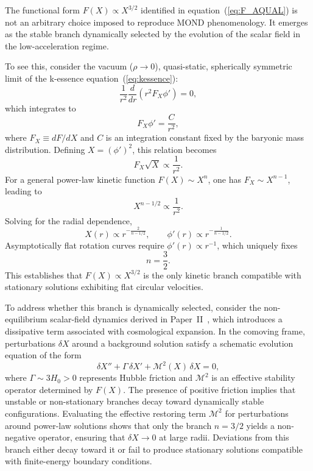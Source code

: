 \documentclass[11pt,a4paper]{article}
\begin{document}
The functional form $F(X) \propto X^{3/2}$ identified in
equation~(\ref{eq:F_AQUAL}) is not an arbitrary choice imposed to reproduce
MOND phenomenology. It emerges as the stable branch dynamically selected by the
evolution of the scalar field in the low-acceleration regime.

To see this, consider the vacuum ($\rho \to 0$), quasi-static, spherically
symmetric limit of the k-essence equation~(\ref{eq:kessence}):
\begin{equation}
  \frac{1}{r^2}\frac{d}{dr}\left(r^2 F_X \phi'\right) = 0,
\end{equation}
which integrates to
\begin{equation}
  F_X \phi' = \frac{C}{r^2},
\end{equation}
where $F_X \equiv dF/dX$ and $C$ is an integration constant fixed by the
baryonic mass distribution. Defining $X = (\phi')^2$, this relation becomes
\begin{equation}
  F_X \sqrt{X} \propto \frac{1}{r^2}.
\end{equation}
For a general power-law kinetic function $F(X)\sim X^n$, one has
$F_X \sim X^{n-1}$, leading to
\begin{equation}
  X^{n - 1/2} \propto \frac{1}{r^2}.
\end{equation}
Solving for the radial dependence,
\begin{equation}
  X(r) \propto r^{-\frac{2}{n - 1/2}},
  \qquad
  \phi'(r) \propto r^{-\frac{1}{n - 1/2}}.
\end{equation}
Asymptotically flat rotation curves require $\phi'(r) \propto r^{-1}$,
which uniquely fixes
\begin{equation}
  n = \frac{3}{2}.
\end{equation}
This establishes that $F(X)\propto X^{3/2}$ is the only kinetic branch
compatible with stationary solutions exhibiting flat circular velocities.

To address whether this branch is dynamically selected, consider the
non-equilibrium scalar-field dynamics derived in Paper~II~\cite{PaperII},
which introduces a dissipative term associated with cosmological expansion.
In the comoving frame, perturbations $\delta X$ around a background solution
satisfy a schematic evolution equation of the form
\begin{equation}
  \delta X'' + \Gamma\,\delta X' + \mathcal{M}^2(X)\,\delta X = 0,
\end{equation}
where $\Gamma \sim 3H_0 > 0$ represents Hubble friction and $\mathcal{M}^2$
is an effective stability operator determined by $F(X)$.
The presence of positive friction implies that unstable or non-stationary
branches decay toward dynamically stable configurations. Evaluating the
effective restoring term $\mathcal{M}^2$ for perturbations around power-law
solutions shows that only the branch $n = 3/2$ yields a non-negative operator,
ensuring that $\delta X \to 0$ at large radii. Deviations from this branch
either decay toward it or fail to produce stationary solutions compatible
with finite-energy boundary conditions.
\end{document}
